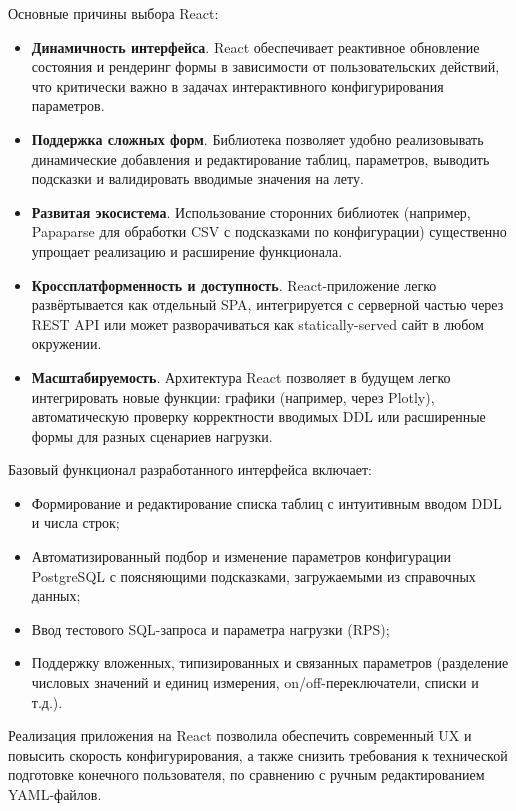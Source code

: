 Основные причины выбора React:

\begin{itemize} \item \textbf{Динамичность интерфейса}. React обеспечивает реактивное обновление состояния и рендеринг формы в зависимости от пользовательских действий, что критически важно в задачах интерактивного конфигурирования параметров. \item \textbf{Поддержка сложных форм}. Библиотека позволяет удобно реализовывать динамические добавления и редактирование таблиц, параметров, выводить подсказки и валидировать вводимые значения на лету. \item \textbf{Развитая экосистема}. Использование сторонних библиотек (например, Papaparse для обработки CSV с подсказками по конфигурации) существенно упрощает реализацию и расширение функционала. \item \textbf{Кроссплатформенность и доступность}. React-приложение легко развёртывается как отдельный SPA, интегрируется с серверной частью через REST API или может разворачиваться как statically-served сайт в любом окружении. \item \textbf{Масштабируемость}. Архитектура React позволяет в будущем легко интегрировать новые функции: графики (например, через Plotly), автоматическую проверку корректности вводимых DDL или расширенные формы для разных сценариев нагрузки. \end{itemize}

Базовый функционал разработанного интерфейса включает:

\begin{itemize} \item Формирование и редактирование списка таблиц с интуитивным вводом DDL и числа строк; \item Автоматизированный подбор и изменение параметров конфигурации PostgreSQL с поясняющими подсказками, загружаемыми из справочных данных; \item Ввод тестового SQL-запроса и параметра нагрузки (RPS); \item Поддержку вложенных, типизированных и связанных параметров (разделение числовых значений и единиц измерения, on/off-переключатели, списки и т.д.). \end{itemize}

Реализация приложения на React позволила обеспечить современный UX и повысить скорость конфигурирования, а также снизить требования к технической подготовке конечного пользователя, по сравнению с ручным редактированием YAML-файлов.

